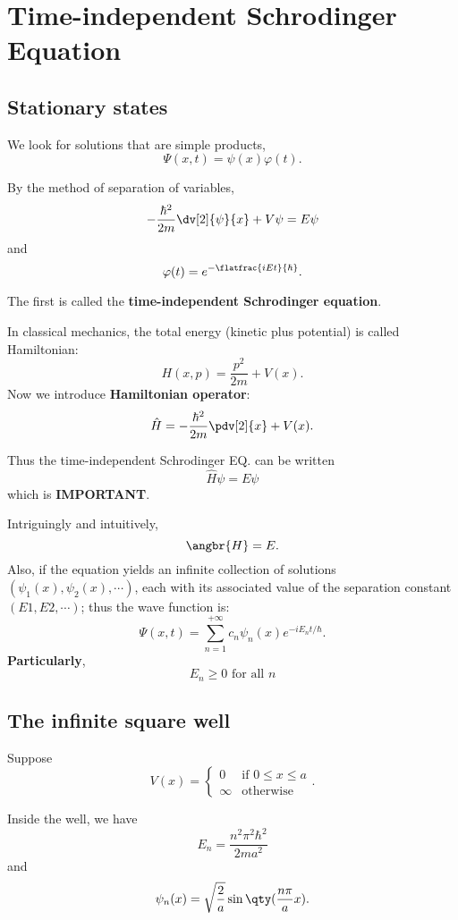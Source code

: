 \section{Time-independent Schrodinger Equation}
\subsection{Stationary states}
We look for solutions that are simple products,
\[
	\Psi(x,t)=\psi(x)\varphi(t)
	.\]

\begin{thm}
	By the method of separation of variables,
	\[
		-\frac{\hbar^2}{2m}\dv[2]{\psi}{x}+V\psi=E\psi
	\] and
	\[
		\varphi(t)=e^{-\flatfrac{iEt}{\hbar}}
		.\]
\end{thm}

The first is called the \textbf{time-independent Schrodinger equation}.

\begin{defi}[Hamiltonian]
	In classical mechanics, the total energy (kinetic plus potential) is called Hamiltonian:
	\[
		H(x,p)=\frac{p^2}{2m}+V(x)
		.\]
	Now we introduce \textbf{Hamiltonian operator}:
	\[
		\hat{H}=-\frac{\hbar^2}{2m}\pdv[2]{x}+V(x)
		.\]
\end{defi}
Thus the time-independent Schrodinger EQ. can be written
\[
	\hat{H}\psi=E\psi
\]
which is \textbf{IMPORTANT}.

\begin{remark}
	Intriguingly and intuitively,
	\[
		\angbr{H}=E
		.\]
	Also, if the equation yields an infinite collection of solutions $(\psi_1(x),\psi_2(x),\cdots)$, each with its associated value of the separation constant $(E1,E2,\cdots)$; thus the wave function is:
	\[
		\Psi(x,t)=\sum_{n=1}^{+\infty}c_n\psi_n(x)e^{-iE_nt /\hbar}
		.\]
	\textbf{Particularly},
	\begin{equation*}
		E_n\ge 0 \text{ for all }n
		\label{E_greater_than_zero}
	\end{equation*}
\end{remark}

\subsection{The infinite square well}
Suppose
\[
	V(x)=
	\begin{cases}
		0      & \mbox{if }0\le x\le a \\
		\infty & \mbox{otherwise}
	\end{cases}
	.\]

\begin{thm}
	Inside the well, we have
	\[
		E_n=\frac{n^2\pi^2\hbar^2}{2ma^2}
	\]
	and
	\[
		\psi_n(x)=\sqrt{\frac{2}{a}}\sin\qty(\frac{n\pi}{a}x)
		.\]
\end{thm}

